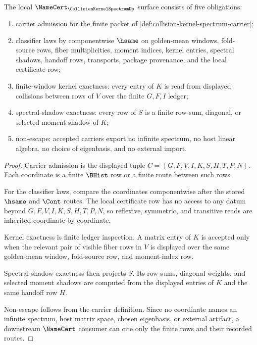 \begin{theorem}
\label{thm:collision-kernel-spectrum-namecert-obligations}
The local $\NameCert_{\CollisionKernelSpectrumUp}$ surface consists of five obligations:
\begin{enumerate}
\item carrier admission for the finite packet of \autoref{def:collision-kernel-spectrum-carrier};
\item classifier laws by componentwise $\hsame$ on golden-mean windows, fold-source rows, fiber multiplicities, moment indices, kernel entries, spectral shadows, handoff rows, transports, package provenance, and the local certificate row;
\item finite-window kernel exactness: every entry of $K$ is read from displayed collisions between rows of $V$ over the finite $G,F,I$ ledger;
\item spectral-shadow exactness: every row of $S$ is a finite row-sum, diagonal, or selected moment shadow of $K$;
\item non-escape: accepted carriers export no infinite spectrum, no host linear algebra, no choice of eigenbasis, and no external import.
\end{enumerate}
\end{theorem}
\begin{proof}
Carrier admission is the displayed tuple $C=(G,F,V,I,K,S,H,T,P,N)$. Each coordinate is a finite $\BHist$ row or a finite route between such rows.

For the classifier laws, compare the coordinates componentwise after the stored $\hsame$ and $\Cont$ routes. The local certificate row has no access to any datum beyond $G,F,V,I,K,S,H,T,P,N$, so reflexive, symmetric, and transitive reads are inherited coordinate by coordinate.

Kernel exactness is finite ledger inspection. A matrix entry of $K$ is accepted only when the relevant pair of visible fiber rows in $V$ is displayed over the same golden-mean window, fold-source row, and moment-index row.

Spectral-shadow exactness then projects $S$. Its row sums, diagonal weights, and selected moment shadows are computed from the displayed entries of $K$ and the same handoff row $H$.

Non-escape follows from the carrier definition. Since no coordinate names an infinite spectrum, host matrix space, chosen eigenbasis, or external artifact, a downstream $\NameCert$ consumer can cite only the finite rows and their recorded routes.
\end{proof}

